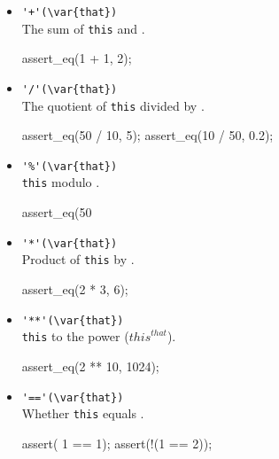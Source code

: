 \begin{itemize}
\item \lstinline|'+'(\var{that})|\\
  The sum of \lstinline|this| and .
\begin{urbiscript}
assert_eq(1 + 1, 2);
\end{urbiscript}

\item \lstinline|'/'(\var{that})|\\
  The quotient of \lstinline|this| divided by .
\begin{urbiscript}
assert_eq(50 / 10, 5);
assert_eq(10 / 50, 0.2);
\end{urbiscript}

\item \lstinline|'%'(\var{that})|\\
  \lstinline|this| modulo .
\begin{urbiscript}
assert_eq(50 %
\end{urbiscript}

\item \lstinline|'*'(\var{that})|\\
  Product of \lstinline|this| by .
\begin{urbiscript}
assert_eq(2 * 3, 6);
\end{urbiscript}

\item \lstinline|'**'(\var{that})|\\
  \lstinline|this| to the  power (${this}^{that}$).
\begin{urbiscript}
assert_eq(2 ** 10, 1024);
\end{urbiscript}

\item \lstinline|'=='(\var{that})|\\
  Whether \lstinline|this| equals .
\begin{urbiscript}
assert(  1 == 1);
assert(!(1 == 2));
\end{urbiscript}
\end{itemize}


